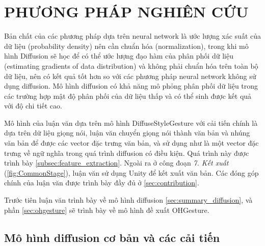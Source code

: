 %   

\chapter{PHƯƠNG PHÁP NGHIÊN CỨU}
\label{chap:Chapter3}

Bản chất của các phương pháp dựa trên neural network là ước lượng xác suất của dữ liệu (probability density) nên cần chuẩn hóa (normalization), trong khi mô hình Diffusion sẽ học để có thể ước lượng đạo hàm của phân phối dữ liệu \cite{song2021score} (estimating gradients of data distribution) và không phải chuẩn hóa trên toàn bộ dữ liệu, nên có kết quả tốt hơn so với các phương pháp neural network không sử dụng diffusion. Mô hình diffusion có khả năng mô phỏng phân phối dữ liệu trong các trường hợp mật độ phân phối của dữ liệu thấp và có thể sinh được kết quả với độ chi tiết cao.

Mô hình của luận văn dựa trên mô hình DiffuseStyleGesture \cite{yang2022DiffuseStyleGestureplus} với cải tiến chính là dựa trên dữ liệu giọng nói, luận văn chuyển giọng nói thành văn bản và nhúng văn bản để được các vector đặc trưng văn bản, và sử dụng như là một vector đặc trưng về ngữ nghĩa trong quá trình diffusion có điều kiện. Quá trình này được trình bày \autoref{subsec:feature_extraction}. Ngoài ra ở công đoạn \textit{7. Kết xuất}  (\autoref{fig:CommonStage}), luận văn sử dụng Unity để kết xuất văn bản. Các đóng góp chính của luận văn được trình bày đầy đủ ở \autoref{sec:contribution}.

Trước tiên luận văn trình bày về mô hình diffusion \autoref{sec:summary_diffusion}, và phần \autoref{sec:ohgesture} sẽ trình bày về mô hình đề xuất OHGesture.

\section{Mô hình diffusion cơ bản và các cải tiến}
\label{sec:summary_diffusion}

